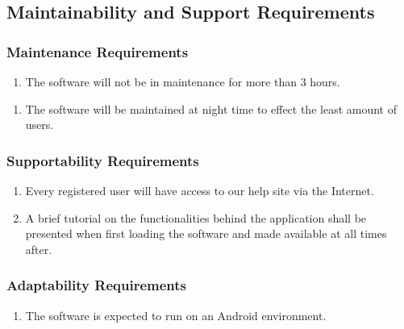 \documentclass[]{article}
\begin{document}

\subsection{Maintainability and Support Requirements}
\label{sub:maintainability_and_support_requirements}

\subsubsection{Maintenance Requirements}
\label{ssub:maintenance_requirements}
\begin{enumerate}[{MS}1. ]
	\item The software will not be in maintenance for more than 3 hours.
\end{enumerate}
\begin{enumerate}[{MS}2. ]
	\item The software will be maintained at night time to effect the least amount
of users.
\end{enumerate}

\subsubsection{Supportability Requirements}
\label{ssub:supportability_requirements}
\begin{enumerate}[{MS}1. ]
	\item Every registered user will have access to our help site via the Internet.
	\item A brief tutorial on the functionalities behind the application shall be
presented when first loading the software and made available at all times after.

\end{enumerate}

\subsubsection{Adaptability Requirements}
\label{ssub:adaptability_requirements}
\begin{enumerate}[{MS}1. ]
	\item  The software is expected to run on an Android environment.
\end{enumerate}

\end{document}
